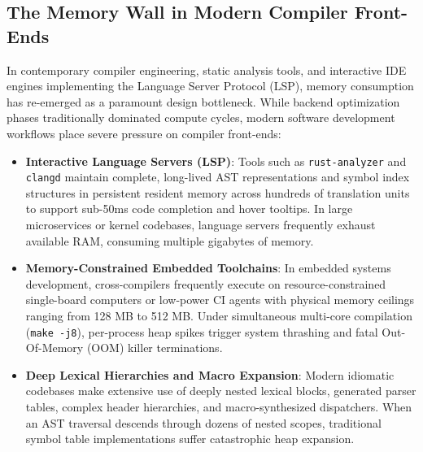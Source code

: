 \documentclass[11pt,a4paper]{article}
\begin{document}
\subsection{The Memory Wall in Modern Compiler Front-Ends}
In contemporary compiler engineering, static analysis tools, and interactive IDE engines implementing the Language Server Protocol (LSP), memory consumption has re-emerged as a paramount design bottleneck. While backend optimization phases traditionally dominated compute cycles, modern software development workflows place severe pressure on compiler front-ends:
\begin{itemize}
    \item \textbf{Interactive Language Servers (LSP)}: Tools such as \texttt{rust-analyzer} and \texttt{clangd} maintain complete, long-lived AST representations and symbol index structures in persistent resident memory across hundreds of translation units to support sub-50ms code completion and hover tooltips. In large microservices or kernel codebases, language servers frequently exhaust available RAM, consuming multiple gigabytes of memory.
    \item \textbf{Memory-Constrained Embedded Toolchains}: In embedded systems development, cross-compilers frequently execute on resource-constrained single-board computers or low-power CI agents with physical memory ceilings ranging from 128 MB to 512 MB. Under simultaneous multi-core compilation (\texttt{make -j8}), per-process heap spikes trigger system thrashing and fatal Out-Of-Memory (OOM) killer terminations.
    \item \textbf{Deep Lexical Hierarchies and Macro Expansion}: Modern idiomatic codebases make extensive use of deeply nested lexical blocks, generated parser tables, complex header hierarchies, and macro-synthesized dispatchers. When an AST traversal descends through dozens of nested scopes, traditional symbol table implementations suffer catastrophic heap expansion.
\end{itemize}
\end{document}
